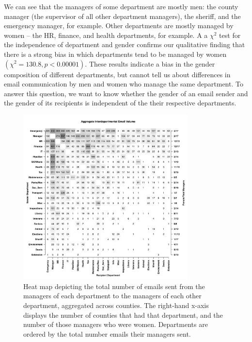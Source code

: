 \documentclass{pnastwo}
\begin{document}
\begin{article}
	
We can see that the managers of some department are mostly men: the county manager (the supervisor of all other department managers), the sheriff, and the emergency manager, for example. Other departments  are mostly managed by women -- the HR, finance, and health departments, for example. A a $\chi^2$ test for the independence of department and gender confirms our qualitative finding that there is a strong bias in which departments tend to be managed by women $(\chi^2 = 130.8, p < 0.00001)$. These results indicate a bias in the gender composition of different departments, but cannot tell us about differences in email communication by men and women who manage the same department. To answer this question, we want to know whether the gender of an email sender and the gender of its recipients is independent of the their respective departments. 
	
	\begin{figure}
	\centering
	\includegraphics[width = 0.8\textwidth]{images/Aggregate_Email_Flows.pdf}
	\caption{\label{fig:heatmaps}Heat map depicting the total number of emails sent from the managers of each department to the managers of each other department, aggregated across counties. The right-hand x-axis displays the number of counties that had that department, and the number of those managers who were women. Departments are ordered by the total number emails their managers sent.}
	\end{figure}
	

\end{article}
\end{document}
